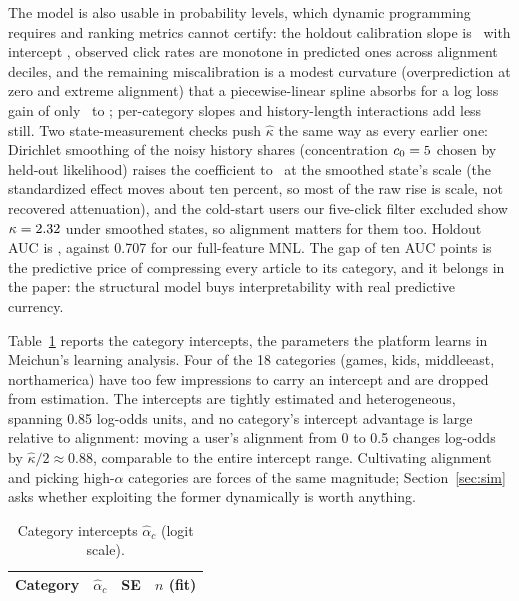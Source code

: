 \documentclass[11pt]{article}
\begin{document}
The model is also usable in probability levels, which dynamic
programming requires and ranking metrics cannot certify: the holdout
calibration slope is \calslope\ with intercept \calint, observed click
rates are monotone in predicted ones across alignment deciles, and the
remaining miscalibration is a modest curvature (overprediction at zero
and extreme alignment) that a piecewise-linear spline absorbs for a log
loss gain of only \loglossbase\ to \loglossspline; per-category slopes
and history-length interactions add less still. Two state-measurement
checks push $\hat\kappa$ the same way as every earlier one: Dirichlet
smoothing of the noisy history shares (concentration $c_0=5$
chosen by held-out likelihood) raises the coefficient to \kapsm\ at the
smoothed state's scale (the standardized effect moves about ten percent,
so most of the raw rise is scale, not recovered attenuation), and the
cold-start users our five-click filter excluded show
$\kappa=2.32$ under smoothed states, so alignment matters for them
too. Holdout AUC is \aucholdout, against 0.707 for our
full-feature MNL. The gap
of ten AUC points is the predictive price of compressing every article to
its category, and it belongs in the paper: the structural model buys
interpretability with real predictive currency.

Table~\ref{tab:alpha} reports the category intercepts, the parameters the
platform learns in Meichun's learning analysis. Four of the 18 categories (games,
kids, middleeast, northamerica) have too few impressions to carry an
intercept and are dropped from estimation. The intercepts are tightly
estimated and heterogeneous, spanning 0.85 log-odds units, and no
category's intercept advantage is large relative to alignment: moving a
user's alignment from 0 to 0.5 changes log-odds by $\hat\kappa/2\approx
0.88$, comparable to the entire intercept range. Cultivating alignment and
picking high-$\alpha$ categories are forces of the same magnitude;
Section~\ref{sec:sim} asks whether exploiting the former dynamically is
worth anything.

\begin{table}[ht]
\centering
\caption{Category intercepts $\hat\alpha_c$ (logit scale).}
\label{tab:alpha}
\begin{tabular}{lrrr}
\toprule
Category & $\hat\alpha_c$ & SE & $n$ (fit) \\
\midrule

\end{tabular}
\end{table}
\end{document}
